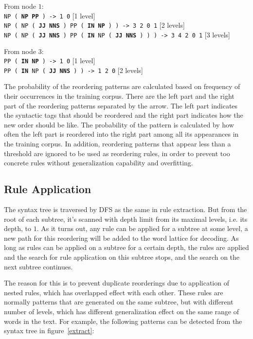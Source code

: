 \documentclass[a4paper]{article}
\begin{document}
\noindent From node $1$:\\
\texttt{NP ( \textbf{NP} \textbf{PP} ) -> 1 0} \hfill [1 level]\hphantom{s}\\
\texttt{NP ( NP ( \textbf{JJ} \textbf{NNS} ) PP ( \textbf{IN} \textbf{NP} ) ) -> 3 2 0 1} \hfill [2 levels]\\
\texttt{NP ( NP ( \textbf{JJ} \textbf{NNS} ) PP ( \textbf{IN} NP ( \textbf{JJ} \textbf{NNS} ) ) ) -> 3 4 2 0 1} \hfill [3 levels]\medskip

\noindent From node $3$:\\
\texttt{PP ( \textbf{IN} \textbf{NP} ) -> 1 0} \hfill [1 level]\hphantom{s}\\
\texttt{PP ( \textbf{IN} NP ( \textbf{JJ} \textbf{NNS} ) ) -> 1 2 0} \hfill [2 levels]\bigskip

The probability of the reordering patterns are calculated based on frequency of their occurrences in the training corpus. There are the left part and the right part of the reordering patterns separated by the arrow. The left part indicates the syntactic tags that should be reordered and the right part indicates how the new order should be like. The probability of the pattern is calculated by how often the left part is reordered into the right part among all its appearances in the training corpus. In addition, reordering patterns that appear less than a threshold are ignored to be used as reordering rules, in order to prevent too concrete rules without generalization capability and overfitting.

\subsection{Rule Application}

The syntax tree is traversed by DFS as the same in rule extraction. But from the root of each subtree, it's scanned with depth limit from its maximal levels, i.e. its depth, to $1$. As it turns out, any rule can be applied for a subtree at some level, a new path for this reordering will be added to the word lattice for decoding. As long as rules can be applied on a subtree for a certain depth, the rules are applied and the search for rule application on this subtree stops, and the search on the next subtree continues. 

The reason for this is to prevent duplicate reorderings due to application of nested rules, which has overlapped effect with each other. These rules are normally patterns that are generated on the same subtree, but with different number of levels, which has different generalization effect on the same range of words in the text. For example, the following patterns can be detected from the syntax tree in figure~\ref{extract}:\bigskip
\end{document}
